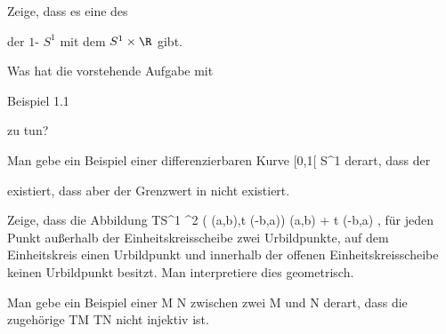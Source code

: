 {}
{





Zeige, dass es eine
des

 der
$1$-
$S^1$ mit dem
$S^1 \times \R$ gibt.





}
{} {}
Was hat die vorstehende Aufgabe mit

Beispiel 1.1

zu tun?

{}
{





Man gebe ein Beispiel einer differenzierbaren Kurve
\maabbdisp {\gamma} { [0,1[} { S^1
} {}
derart, dass der

 existiert, dass aber der Grenzwert
 in
 nicht existiert.





}
{} {}

{}
{





Zeige, dass die Abbildung
\maabbeledisp {} {TS^1} { \R^2
} {( (a,b),t (-b,a))} { (a,b) + t (-b,a)
} {,}
für jeden Punkt
 außerhalb der Einheitskreisscheibe zwei Urbildpunkte, auf dem Einheitskreis einen Urbildpunkt und innerhalb der offenen Einheitskreisscheibe keinen Urbildpunkt besitzt. Man interpretiere dies geometrisch.





}
{} {}

{}
{





Man gebe ein Beispiel einer
\maabbdisp {\varphi} { M } { N
} {}
zwischen zwei
\mathkor {} {M} {und} {N} {}
derart, dass die zugehörige
 {TM} {TN
} {}
nicht injektiv ist.





}
{} {}

